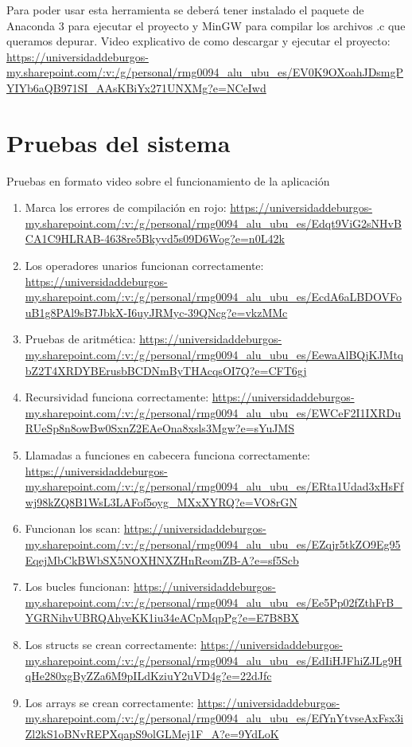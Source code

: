 Para poder usar esta herramienta se deberá tener instalado el paquete de Anaconda 3 para ejecutar el proyecto y MinGW  para compilar los archivos .c que queramos depurar.
Video explicativo de como descargar y ejecutar el proyecto: \url{https://universidaddeburgos-my.sharepoint.com/:v:/g/personal/rmg0094_alu_ubu_es/EV0K9OXoahJDsmgPYIYb6aQB971SI_AAsKBiYx271UNXMg?e=NCeIwd}

\section{Pruebas del sistema}

Pruebas en formato video sobre el funcionamiento de la aplicación

\begin{enumerate}
\item Marca los errores de compilación en rojo: \url{https://universidaddeburgos-my.sharepoint.com/:v:/g/personal/rmg0094_alu_ubu_es/Edqt9ViG2sNHvBCA1C9HLRAB-4638re5Bkyvd5s09D6Wog?e=n0L42k}
\item Los operadores unarios funcionan correctamente: \url{https://universidaddeburgos-my.sharepoint.com/:v:/g/personal/rmg0094_alu_ubu_es/EcdA6aLBDOVFouB1g8PAl9sB7JbkX-I6uyJRMyc-39QNcg?e=vkzMMc}
\item Pruebas de aritmética: \url{https://universidaddeburgos-my.sharepoint.com/:v:/g/personal/rmg0094_alu_ubu_es/EewaAlBQjKJMtqbZ2T4XRDYBErusbBCDNmByTHAcqsOI7Q?e=CFT6gj}
\item Recursividad funciona correctamente: \url{https://universidaddeburgos-my.sharepoint.com/:v:/g/personal/rmg0094_alu_ubu_es/EWCeF2I1IXRDuRUeSp8n8owBw0SxnZ2EAeOna8xsls3Mgw?e=sYuJMS}
\item Llamadas a funciones en cabecera funciona correctamente: \url{https://universidaddeburgos-my.sharepoint.com/:v:/g/personal/rmg0094_alu_ubu_es/ERta1Udad3xHsFfwj98kZQ8B1WsL3LAFof5oyg_MXxXYRQ?e=VO8rGN}
\item Funcionan los scan: \url{https://universidaddeburgos-my.sharepoint.com/:v:/g/personal/rmg0094_alu_ubu_es/EZqjr5tkZO9Eg95EqejMbCkBWbSX5NOXHNXZHnReomZB-A?e=sf5Scb}
\item Los bucles funcionan: \url{https://universidaddeburgos-my.sharepoint.com/:v:/g/personal/rmg0094_alu_ubu_es/Ee5Pp02fZthFrB_YGRNihvUBRQAhyeKK1iu34eACpMqpPg?e=E7B8BX}
\item Los structs se crean correctamente: \url{https://universidaddeburgos-my.sharepoint.com/:v:/g/personal/rmg0094_alu_ubu_es/EdIiHJFhiZJLg9HqHe280xgByZZa6M9pILdKziuY2uVD4g?e=22dJfc}
\item Los arrays se crean correctamente: \url{https://universidaddeburgos-my.sharepoint.com/:v:/g/personal/rmg0094_alu_ubu_es/EfYnYtvseAxFsx3iZl2kS1oBNvREPXqapS9olGLMej1F_A?e=9YdLoK}
\end{enumerate}